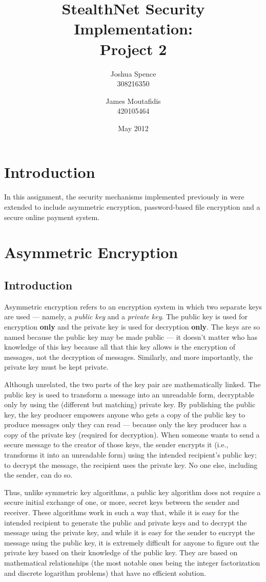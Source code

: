 \documentclass[a4paper,11pt]{article}
\title{StealthNet Security Implementation: \\ Project 2}
\author{Joshua Spence \\ 308216350 \and James Moutafidis \\ 420105464}
\date{May 2012}
\begin{document}
\maketitle

\section{Introduction}
In this assignment, the security mechanisms implemented previously in 
\packageName{} were extended to include asymmetric encryption, password-based 
file encryption and a secure online payment system.

\section{Asymmetric Encryption}

\subsection{Introduction}
Asymmetric encryption refers to an encryption system in which two separate keys 
are used --- namely, a \emph{public key} and a \emph{private key}. The public 
key is used for encryption \textbf{only} and the private key is used for
decryption \textbf{only}. The keys are so named because the public key may be 
made public --- it doesn't matter who has knowledge of this key because all that
this key allows is the encryption of messages, not the decryption of messages. 
Similarly, and more importantly, the private key must be kept private.

Although unrelated, the two parts of the key pair are mathematically linked. The
public key is used to transform a message into an unreadable form, decryptable 
only by using the (different but matching) private key. By publishing the public
key, the key producer empowers anyone who gets a copy of the public key to 
produce messages only they can read --- because only the key producer has a copy
of the private key (required for decryption). When someone wants to send a 
secure message to the creator of those keys, the sender encrypts it (i.e., 
transforms it into an unreadable form) using the intended recipient's public 
key; to decrypt the message, the recipient uses the private key. No one else, 
including the sender, can do so.

Thus, unlike symmetric key algorithms, a public key algorithm does not require a
secure initial exchange of one, or more, secret keys between the sender and 
receiver. These algorithms work in such a way that, while it is easy for the 
intended recipient to generate the public and private keys and to decrypt the 
message using the private key, and while it is easy for the sender to encrypt 
the message using the public key, it is extremely difficult for anyone to figure
out the private key based on their knowledge of the public key. They are based 
on mathematical relationships (the most notable ones being the integer 
factorization and discrete logarithm problems) that have no efficient solution.
\end{document}
